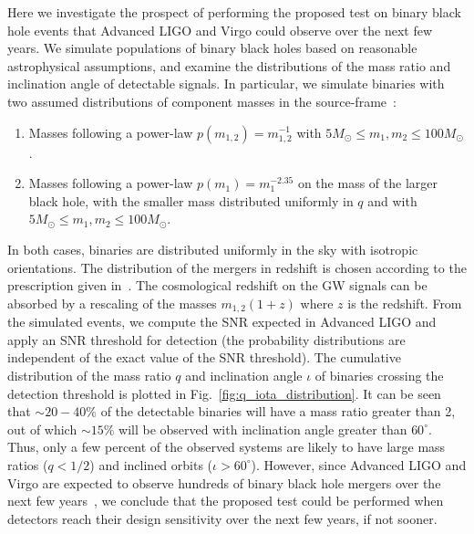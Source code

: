 \documentclass[prl,preprintnumbers,twocolumn,eqsecnum,floatfix,a4paper,nofootinbib,superscriptaddress]{revtex4}
\begin{document}
Here we investigate the  prospect of performing the proposed test on binary black hole events that Advanced LIGO and Virgo could observe over the next few years.  We simulate populations of binary black holes based on reasonable astrophysical assumptions, and examine the distributions of the mass ratio and inclination angle of detectable signals. In particular, we simulate binaries with two assumed distributions of component masses in the source-frame~\cite{Abbott:2016nhf}:
\begin{enumerate}
\item Masses following a power-law $p(m_{1,2}) = m_{1,2}^{-1}$ with $5 M_\odot \leq m_1, m_2  \leq 100 M_\odot$. 
\item Masses following a power-law $p(m_1) = m_1^{-2.35}$ on the mass of the larger black hole, with the smaller mass distributed uniformly in $q$ and with $5 M_\odot \leq m_1, m_2  \leq 100 M_\odot$. 
\end{enumerate}
In both cases, binaries are distributed uniformly in the sky with isotropic orientations. The distribution of the mergers in redshift is chosen according to the prescription given in~\cite{Dominik:2013tma}. The cosmological redshift on the GW signals can be absorbed by a rescaling of the masses $m_{1,2} (1+z)$ where $z$ is the redshift. From the simulated events, we compute the SNR expected  in Advanced LIGO and apply an SNR threshold for detection (the probability distributions are independent of the exact value of the SNR threshold). The cumulative distribution of the mass ratio $q$ and inclination angle $\iota$ of binaries crossing the detection threshold is plotted in Fig.~\ref{fig:q_iota_distribution}. It can be seen that $\sim 20 - 40\%$ of the detectable binaries will have a mass ratio greater than 2, out of which  $\sim 15\%$ will  be observed with inclination angle greater than $60^\circ$. Thus, only a few percent of the observed systems are likely to have large mass ratios ($q < 1/2$) and inclined orbits ($\iota > 60^\circ$). However, since Advanced LIGO and Virgo are expected to observe hundreds of binary black hole mergers over the next few years~\cite{Abbott:2016nhf}, we conclude that the proposed test could be performed when detectors reach their design sensitivity over the next few years, if not sooner.
\end{document}
